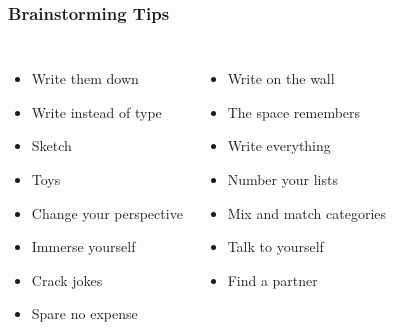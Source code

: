 \documentclass{beamer}
\begin{document}
\begin{frame}
  \frametitle{Brainstorming Tips}

\begin{columns}
\begin{itemize}
\item Write them down\pause
\item Write instead of type\pause
\item Sketch\pause
\item Toys\pause
\item Change your perspective\pause
\item Immerse yourself\pause
\item Crack jokes\pause
\item Spare no expense\pause
\end{itemize}
\begin{itemize}
\item Write on the wall\pause
\item The space remembers\pause
\item Write everything\pause
\item Number your lists\pause
\item Mix and match categories\pause
\item Talk to yourself\pause
\item Find a partner\pause
\end{itemize}
\end{columns}
\end{frame}
\end{document}
